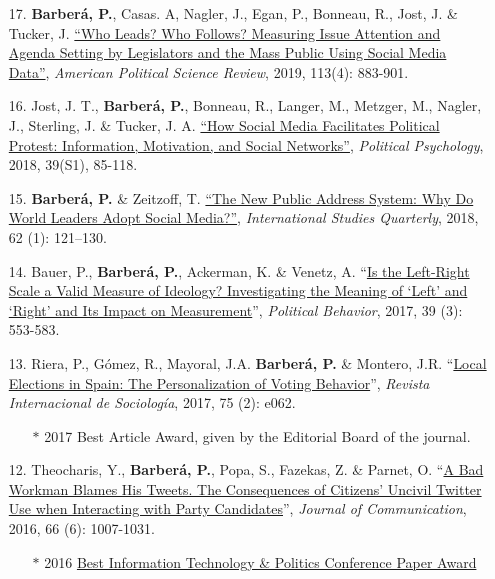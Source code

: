 \documentclass[margin,line,11pt]{resume}
\begin{document}
\begin{resume}
\begin{itemize}[leftmargin=5.5mm]
\item[17.] \textbf{Barber\'{a}, P.}, Casas. A, Nagler, J., Egan, P., Bonneau, R., Jost, J. \& Tucker, J. \href{https://t.co/6KnjCczsqH}{``Who Leads? Who Follows? Measuring Issue Attention and Agenda Setting by Legislators and the Mass Public Using Social Media Data''}, \textit{American Political Science Review}, 2019, 113(4): 883-901.

\item[16.] Jost, J. T., \textbf{Barber\'{a}, P.}, Bonneau, R., Langer, M., Metzger, M., Nagler, J., Sterling, J. \& Tucker, J. A. \href{http://onlinelibrary.wiley.com/doi/10.1111/pops.12478/full}{``How Social Media Facilitates Political Protest: Information, Motivation, and Social Networks''}, \textit{Political Psychology}, 2018, 39(S1), 85-118.

\item[15.] \textbf{Barber\'{a}, P.} \& Zeitzoff, T. \href{https://academic.oup.com/isq/article/doi/10.1093/isq/sqx047/4430887/The-New-Public-Address-System-Why-Do-World-Leaders}{``The New Public Address System: Why Do World Leaders Adopt Social Media?''}, \textit{International Studies Quarterly}, 2018, 62 (1): 121--130.
    
\item[14.] Bauer, P., \textbf{Barber\'{a}, P.}, Ackerman, K. \& Venetz, A. ``\href{http://link.springer.com/article/10.1007/s11109-016-9368-2}{Is the Left-Right Scale a Valid Measure of Ideology? Investigating the Meaning of `Left' and `Right' and Its Impact on Measurement}'', \textit{Political Behavior}, 2017, 39 (3): 553-583.

\item[13.] Riera, P., G\'{o}mez, R., Mayoral, J.A. \textbf{Barber\'{a}, P.} \& Montero, J.R. ``\href{http://revintsociologia.revistas.csic.es/index.php/revintsociologia/article/view/675/832}{Local Elections in Spain: The Personalization of Voting Behavior}'', \textit{Revista Internacional de Sociolog\'{i}a}, 2017, 75 (2): e062.
\begin{itemize}
\item[] $\ast$ 2017 Best Article Award, given by the Editorial Board of the journal.
\end{itemize}

\item[12.] Theocharis, Y., \textbf{Barber\'{a}, P.}, Popa, S., Fazekas, Z. \& Parnet, O. ``\href{http://onlinelibrary.wiley.com/doi/10.1111/jcom.12259/abstract}{A Bad Workman Blames His Tweets. The Consequences of Citizens' Uncivil Twitter Use when Interacting with Party Candidates}'', \textit{Journal of Communication}, 2016, 66 (6): 1007-1031.
\begin{itemize}
\item[] $\ast$ 2016 \href{http://www.apsanet.org/section-18-best-conference-paper-award}{Best Information Technology \& Politics Conference Paper Award}
\end{itemize}
    

\end{itemize}
\end{resume}
\end{document}
